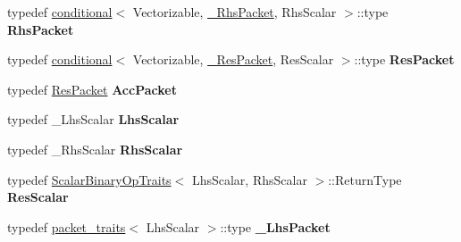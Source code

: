 \begin{DoxyCompactItemize}
\mbox{\label{class_eigen_1_1internal_1_1gebp__traits_add54f631fcf0e21420054b51d0f2c888}} 
typedef \hyperlink{struct_eigen_1_1internal_1_1conditional}{conditional}$<$ Vectorizable, \hyperlink{group___sparse_core___module}{\+\_\+\+Rhs\+Packet}, Rhs\+Scalar $>$\+::type {\bfseries Rhs\+Packet}
\item 
\mbox{\label{class_eigen_1_1internal_1_1gebp__traits_a104675cab0d5615df1fd429b077a98e7}} 
typedef \hyperlink{struct_eigen_1_1internal_1_1conditional}{conditional}$<$ Vectorizable, \hyperlink{group___sparse_core___module}{\+\_\+\+Res\+Packet}, Res\+Scalar $>$\+::type {\bfseries Res\+Packet}
\item 
\mbox{\label{class_eigen_1_1internal_1_1gebp__traits_ad1a9a705dd13f8f610e958c4e2ca0f2a}} 
typedef \hyperlink{class_eigen_1_1internal_1_1_tensor_lazy_evaluator_writable}{Res\+Packet} {\bfseries Acc\+Packet}
\item 
\mbox{\label{class_eigen_1_1internal_1_1gebp__traits_a2f117fb54968e17442eef419b254d26a}} 
typedef \+\_\+\+Lhs\+Scalar {\bfseries Lhs\+Scalar}
\item 
\mbox{\label{class_eigen_1_1internal_1_1gebp__traits_a8021575dd93cdaaaf840b07215e155e6}} 
typedef \+\_\+\+Rhs\+Scalar {\bfseries Rhs\+Scalar}
\item 
\mbox{\label{class_eigen_1_1internal_1_1gebp__traits_ac3d728a0433e7ef90f927de45957add7}} 
typedef \hyperlink{group___core___module_struct_eigen_1_1_scalar_binary_op_traits}{Scalar\+Binary\+Op\+Traits}$<$ Lhs\+Scalar, Rhs\+Scalar $>$\+::Return\+Type {\bfseries Res\+Scalar}
\item 
\mbox{\label{class_eigen_1_1internal_1_1gebp__traits_af99d6dfef8f5b992560601e7fed9b530}} 
typedef \hyperlink{struct_eigen_1_1internal_1_1packet__traits}{packet\+\_\+traits}$<$ Lhs\+Scalar $>$\+::type {\bfseries \+\_\+\+Lhs\+Packet}
\item 
\mbox{\label{class_eigen_1_1internal_1_1gebp__traits_a40b491d09a1def7c3257d0cd8b036226}} 

\end{DoxyCompactItemize}
